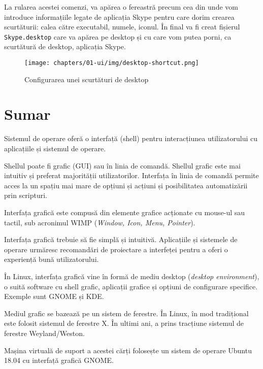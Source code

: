 
La rularea acestei comenzi, va apărea o fereastră precum cea din  unde vom introduce informațiile legate de aplicația Skype pentru care dorim crearea scurtăturii: calea către executabil, numele, iconul. În final va fi creat fișierul \texttt{Skype.desktop} care va apărea pe desktop și cu care vom putea porni, ca scurtătură de desktop, aplicația Skype.

\begin{figure}[!htbp]
  \centering
  \texttt{[image: chapters/01-ui/img/desktop-shortcut.png]}
  \caption{Configurarea unei scurtături de desktop}
  \label{fig:ui:desktop-shortcut}
\end{figure}

\section{Sumar}
\label{sec:ui:summary}

Sistemul de operare oferă o interfață (shell) pentru interacțiunea utilizatorului cu aplicațiile și sistemul de operare.

Shellul poate fi grafic (GUI) sau în linia de comandă. Shellul grafic este mai intuitiv și preferat majorității utilizatorilor. Interfața în linia de comandă permite acces la un spațiu mai mare de opțiuni și acțiuni și posibilitatea automatizării prin scripturi.

Interfața grafică este compusă din elemente grafice acționate cu mouse-ul sau tactil, sub acronimul WIMP (\textit{Window, Icon, Menu, Pointer}).

Interfața grafică trebuie să fie simplă și intuitivă. Aplicațiile și sistemele de operare urmăresc recomandări de proiectare a interfeței pentru a oferi o experiență bună utilizatorului.

În Linux, interfața grafică vine în formă de mediu desktop (\textit{desktop environment}), o suită software cu shell grafic, aplicații grafice și opțiuni de configurare specifice. Exemple sunt GNOME și KDE.

Mediul grafic se bazează pe un sistem de ferestre. În Linux, în mod tradițional este folosit sistemul de ferestre X. În ultimi ani, a prins tracțiune sistemul de ferestre Weyland/Weston.

Mașina virtuală de suport a acestei cărți folosește un sistem de operare Ubuntu 18.04 cu interfață grafică GNOME.
